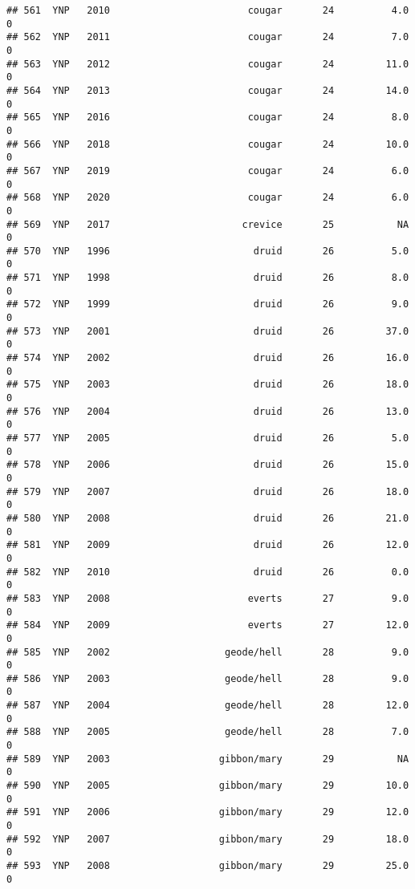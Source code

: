 \documentclass[
]{article}
\begin{document}
\begin{verbatim}
## 561  YNP   2010                        cougar       24          4.0       0
## 562  YNP   2011                        cougar       24          7.0       0
## 563  YNP   2012                        cougar       24         11.0       0
## 564  YNP   2013                        cougar       24         14.0       0
## 565  YNP   2016                        cougar       24          8.0       0
## 566  YNP   2018                        cougar       24         10.0       0
## 567  YNP   2019                        cougar       24          6.0       0
## 568  YNP   2020                        cougar       24          6.0       0
## 569  YNP   2017                       crevice       25           NA       0
## 570  YNP   1996                         druid       26          5.0       0
## 571  YNP   1998                         druid       26          8.0       0
## 572  YNP   1999                         druid       26          9.0       0
## 573  YNP   2001                         druid       26         37.0       0
## 574  YNP   2002                         druid       26         16.0       0
## 575  YNP   2003                         druid       26         18.0       0
## 576  YNP   2004                         druid       26         13.0       0
## 577  YNP   2005                         druid       26          5.0       0
## 578  YNP   2006                         druid       26         15.0       0
## 579  YNP   2007                         druid       26         18.0       0
## 580  YNP   2008                         druid       26         21.0       0
## 581  YNP   2009                         druid       26         12.0       0
## 582  YNP   2010                         druid       26          0.0       0
## 583  YNP   2008                        everts       27          9.0       0
## 584  YNP   2009                        everts       27         12.0       0
## 585  YNP   2002                    geode/hell       28          9.0       0
## 586  YNP   2003                    geode/hell       28          9.0       0
## 587  YNP   2004                    geode/hell       28         12.0       0
## 588  YNP   2005                    geode/hell       28          7.0       0
## 589  YNP   2003                   gibbon/mary       29           NA       0
## 590  YNP   2005                   gibbon/mary       29         10.0       0
## 591  YNP   2006                   gibbon/mary       29         12.0       0
## 592  YNP   2007                   gibbon/mary       29         18.0       0
## 593  YNP   2008                   gibbon/mary       29         25.0       0

\end{verbatim}
\end{document}
